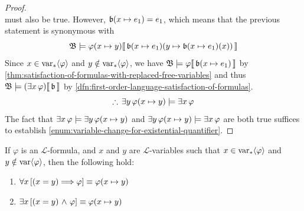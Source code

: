 \begin{proof}
\begin{equation*}
    \end{equation*}
    must also be true. However, \( \folmodifiedvariableassignmentfunction{\mathfrak{b}}{x}{e_{1}} = e_{1} \), which means that the previous statement is synonymous with
    \begin{equation*}
        \folwffsatisfaction{\mathfrak{B}}{ \folfreevariablereplacement{\varphi}{x}{y} }{ \folmodifiedvariableassignmentfunction{ \folmodifiedvariableassignmentfunction{\mathfrak{b}}{x}{e_{1}} }{y}{ \folmodifiedvariableassignmentfunction{\mathfrak{b}}{x}{e_{1}}(x) } }
    \end{equation*}
    Since \( x \in \operatorname{var}_{\ast} \langle\varphi\rangle \) and \( y \notin \operatorname{var}_{\ast} \langle\varphi\rangle \), we have
    \(  \folwffsatisfaction{\mathfrak{B}}{\varphi}{ \folmodifiedvariableassignmentfunction{\mathfrak{b}}{x}{e_{1}} } \)
    by \cref{thm:satisfaction-of-formulas-with-replaced-free-variables} and thus
    \( \folwffsatisfaction{\mathfrak{B}}{ \mleft( \exists x \, \varphi \mright) }{\mathfrak{b}} \) by \cref{dfn:first-order-language-satisfaction-of-formulas}.
    \begin{equation*}
        \therefore \, \exists y \, \folfreevariablereplacement{\varphi}{x}{y} \models \exists x \, \varphi
    \end{equation*}
    The fact that
    \( \exists x \, \varphi \models \exists y \, \folfreevariablereplacement{\varphi}{x}{y} \) and
    \( \exists y \, \folfreevariablereplacement{\varphi}{x}{y} \models \exists x \, \varphi \) are both true suffices to establish
    \ref{enum:variable-change-for-existential-quantifier}.
\end{proof}

\begin{thm}
    \label{logical-equivalence:equivalent-quantified-forms-of-formulas-with-free-variables-replaced}
    If \( \varphi \) is an \( \mathcal{L} \)-formula, and \( x \) and \( y \) are \( \mathcal{L} \)-variables such that
    \( x \in \operatorname{var}_{\ast} \langle\varphi\rangle \) and \( y \notin \operatorname{var} \langle\varphi\rangle \), then the following hold:
    \begin{enumerate}[topsep=2pt,label=\textup{\texttt{(\alph*)}}]
        \item \( \forall x \, \mleft[ \mleft( x = y \mright) {\implies} \varphi \mright] \equiv \folfreevariablereplacement{\varphi}{x}{y} \)
             \label{enum:free-variable-replaced-formula-universal-quantifier-equivalent}
        \item \( \exists x \, \mleft[ \mleft( x = y \mright) \,\,{\land}\,\, \varphi \mright] \equiv \folfreevariablereplacement{\varphi}{x}{y} \)
             \label{enum:free-variable-replaced-formula-existential-quantifier-equivalent}
    \end{enumerate}
\end{thm}


